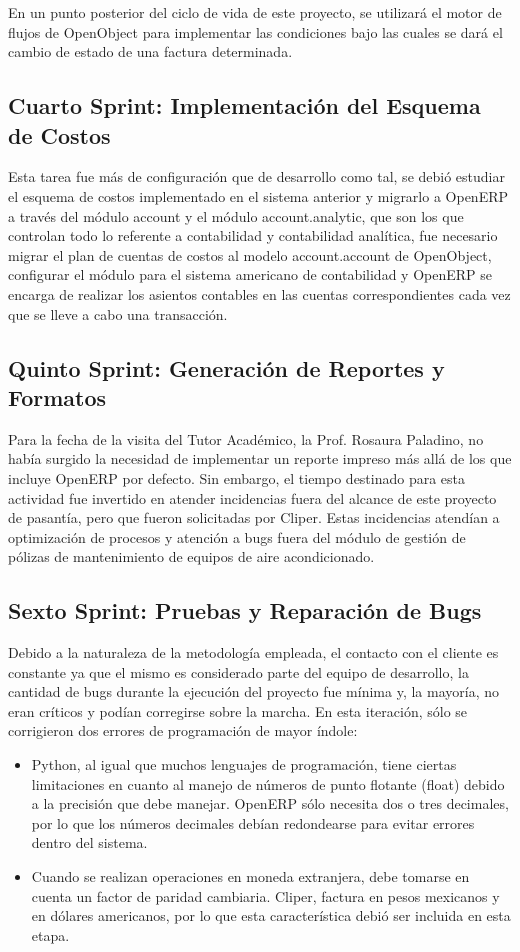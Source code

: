 \documentclass[a4paper, 12pt]{article}
\begin{document}
En un punto posterior del ciclo de vida de este proyecto, se utilizará el motor de flujos de OpenObject para implementar las condiciones bajo las cuales se dará el cambio de estado de una factura determinada.

\subsection{Cuarto Sprint: Implementación del Esquema de Costos}
Esta tarea fue más de configuración que de desarrollo como tal, se debió estudiar el esquema de costos implementado en el sistema anterior y migrarlo a OpenERP a través del módulo account y el módulo account.analytic, que son los que controlan todo lo referente a contabilidad y contabilidad analítica, fue necesario migrar el plan de cuentas de costos al modelo account.account de OpenObject, configurar el módulo para el sistema americano de contabilidad y OpenERP se encarga de realizar los asientos contables en las cuentas correspondientes cada vez que se lleve a cabo una transacción.

\subsection{Quinto Sprint: Generación de Reportes y Formatos}
Para la fecha de la visita del Tutor Académico, la Prof. Rosaura Paladino, no había surgido la necesidad de implementar un reporte impreso más allá de los que incluye OpenERP por defecto. Sin embargo, el tiempo destinado para esta actividad fue invertido en atender incidencias fuera del alcance de este proyecto de pasantía, pero que fueron solicitadas por Cliper. Estas incidencias atendían a optimización de procesos y atención a bugs fuera del módulo de gestión de pólizas de mantenimiento de equipos de aire acondicionado.

\subsection{Sexto Sprint: Pruebas y Reparación de Bugs}
Debido a la naturaleza de la metodología empleada, el contacto con el cliente es constante ya que el mismo es considerado parte del equipo de desarrollo, la cantidad de bugs durante la ejecución del proyecto fue mínima y, la mayoría, no eran críticos y podían corregirse sobre la marcha. En esta iteración, sólo se corrigieron dos errores de programación de mayor índole:
\begin{itemize}
    \item Python, al igual que muchos lenguajes de programación, tiene ciertas limitaciones en cuanto al manejo de números de punto flotante (float) debido a la precisión que debe manejar. OpenERP sólo necesita dos o tres decimales, por lo que los números decimales debían redondearse para evitar errores dentro del sistema.
    \item Cuando se realizan operaciones en moneda extranjera, debe tomarse en cuenta un factor de paridad cambiaria. Cliper, factura en pesos mexicanos y en dólares americanos, por lo que esta característica debió ser incluida en esta etapa.
\end{itemize}
\end{document}
